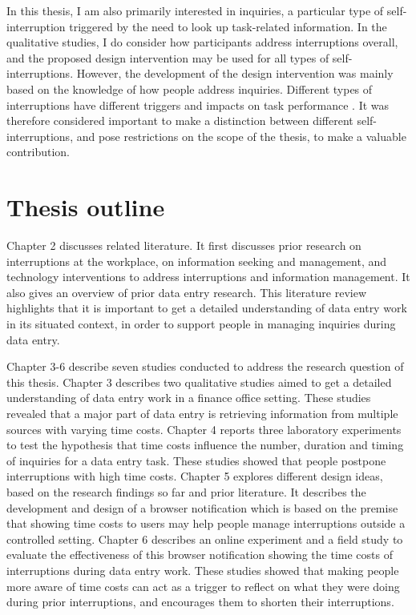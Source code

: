 In this thesis, I am also primarily interested in inquiries, a particular type of self-interruption triggered by the need to look up task-related information. 
In the qualitative studies, I do consider how participants address interruptions overall, and the proposed design intervention may be used for all types of self-interruptions. However, the development of the design intervention was mainly based on the knowledge of how people address inquiries. Different types of interruptions have different triggers and impacts on task performance \citep{Jin2009}. It was therefore considered important to make a distinction between different self-interruptions, and pose restrictions on the scope of the thesis, to make a valuable contribution.

\section{Thesis outline}
Chapter 2 discusses related literature. It first discusses prior research on interruptions at the workplace, on information seeking and management, and technology interventions to address interruptions and information management. It also gives an overview of prior data entry research. This literature review highlights that it is important to get a detailed understanding of data entry work in its situated context, in order to support people in managing inquiries during data entry. 

Chapter 3-6 describe seven studies conducted to address the research question of this thesis. Chapter 3 describes two qualitative studies aimed to get a detailed understanding of data entry work in a finance office setting. These studies revealed that a major part of data entry is retrieving information from multiple sources with varying time costs. Chapter 4 reports three laboratory experiments to test the hypothesis that time costs influence the number, duration and timing of inquiries for a data entry task. These studies showed that people postpone interruptions with high time costs. Chapter 5 explores different design ideas, based on the research findings so far and prior literature. It describes the development and design of a browser notification which is based on the premise that showing time costs to users may help people manage interruptions outside a controlled setting. Chapter 6 describes an online experiment and a field study to evaluate the effectiveness of this browser notification showing the time costs of interruptions during data entry work. These studies showed that making people more aware of time costs can act as a trigger to reflect on what they were doing during prior interruptions, and encourages them to shorten their interruptions.

